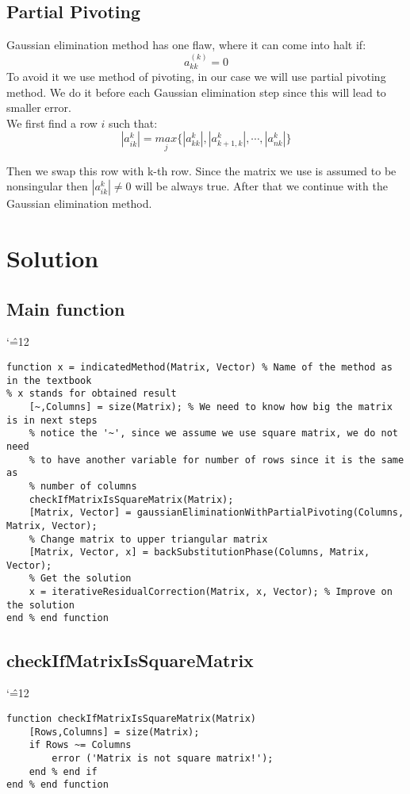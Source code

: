 \documentclass{report}
\newenvironment{simplechar}{%
   \catcode`\^=12
}{}
\begin{document}
\subsection{Partial Pivoting}
Gaussian elimination method has one flaw, where it can come into halt if:
\[ a_{kk}^{(k)} = 0 \]
To avoid it we use method of pivoting, in our case we will use partial pivoting method.
We do it before each Gaussian elimination step since this will lead to smaller error.
\\We first find a row $i$ such that:
\[ |{a_{ik}^{k}}| = \underset{j}{max} \{ |{a_{kk}^{k}}|, |{a_{k+1, k}^{k}}|, \cdots, |{a_{nk}^{k}}|\} \]

Then we swap this row with k-th row. Since the matrix we use is assumed to be nonsingular then $|{a_{ik}^{k}}| \neq 0$ will be always true. After that we continue with the Gaussian elimination method.

\newpage
\section{Solution}

\subsection{Main function}
\begin{simplechar}
\begin{lstlisting}
function x = indicatedMethod(Matrix, Vector) % Name of the method as in the textbook
% x stands for obtained result
    [~,Columns] = size(Matrix); % We need to know how big the matrix is in next steps
    % notice the '~', since we assume we use square matrix, we do not need
    % to have another variable for number of rows since it is the same as
    % number of columns
    checkIfMatrixIsSquareMatrix(Matrix);
    [Matrix, Vector] = gaussianEliminationWithPartialPivoting(Columns, Matrix, Vector);
    % Change matrix to upper triangular matrix
    [Matrix, Vector, x] = backSubstitutionPhase(Columns, Matrix, Vector);
    % Get the solution
    x = iterativeResidualCorrection(Matrix, x, Vector); % Improve on the solution
end % end function
\end{lstlisting}
\end{simplechar}

\subsection{checkIfMatrixIsSquareMatrix}
\begin{simplechar}
\begin{lstlisting}
function checkIfMatrixIsSquareMatrix(Matrix)
    [Rows,Columns] = size(Matrix);
    if Rows ~= Columns
        error ('Matrix is not square matrix!');
    end % end if
end % end function
\end{lstlisting}
\end{simplechar}
\end{document}
